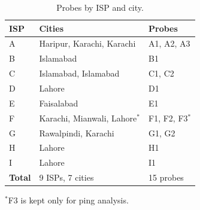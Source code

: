 \documentclass[sigconf,anonymous,10pt]{acmart}
\begin{document}
\begin{table}[t]
\caption{Probes by ISP and city.}
\label{tab:probes}
\footnotesize
\begin{tabular*}{\columnwidth}{@{\extracolsep{\fill}}lll}
\toprule
\textbf{ISP} & \textbf{Cities} & \textbf{Probes} \\
\midrule
A & Haripur, Karachi, Karachi & A1, A2, A3 \\
B & Islamabad                & B1 \\
C & Islamabad, Islamabad     & C1, C2 \\
D & Lahore                   & D1 \\
E & Faisalabad               & E1 \\
F & Karachi, Mianwali, Lahore$^*$ & F1, F2, F3$^*$ \\
G & Rawalpindi, Karachi      & G1, G2 \\
H & Lahore                   & H1 \\
I & Lahore                   & I1 \\
\midrule
\textbf{Total} & 9 ISPs, 7 cities & 15 probes \\
\bottomrule
\end{tabular*}
\smallskip
\raggedright
{\footnotesize $^*$F3 is kept only for ping analysis.}
\end{table}



\end{document}
